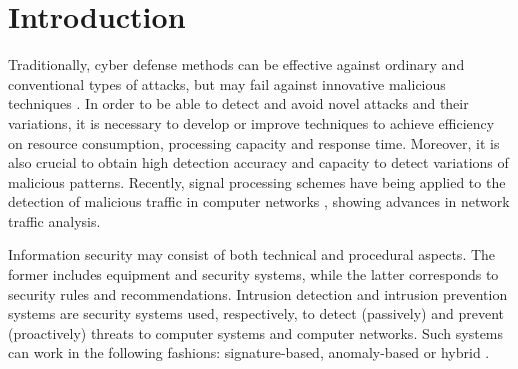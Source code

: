 \documentclass{bmcart}
\begin{document}


\section{Introduction}
\label{sec:introduction}

Traditionally, cyber defense methods can be effective against ordinary and conventional types of attacks, but may fail against innovative malicious techniques \cite{lakhina2005mining}. In order to be able to detect and avoid novel attacks and their variations, it is necessary to develop or improve techniques to achieve efficiency on resource consumption, processing capacity and response time. Moreover, it is also crucial to obtain high detection accuracy and capacity to detect variations of malicious patterns. Recently, signal processing schemes have being applied to the detection of malicious traffic in computer networks \cite{Lu2009,Huang2009,Zonglin2009,david2011blind,da2012improved,tenorio2013greatest}, showing advances in network traffic analysis.

Information security may consist of both technical and procedural aspects. The former includes equipment and security systems, while the latter corresponds to security rules and recommendations. Intrusion detection and intrusion prevention systems are security systems used, respectively, to detect (passively) and prevent (proactively) threats to computer systems and computer networks. Such systems can work in the following fashions: signature-based, anomaly-based or hybrid \cite{Huang2009,mudzingwa2012study}.
\end{document}
